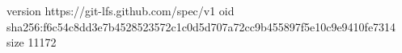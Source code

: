 version https://git-lfs.github.com/spec/v1
oid sha256:f6c54c8dd3e7b4528523572c1c0d5d707a72cc9b455897f5e10c9e9410fe7314
size 11172
